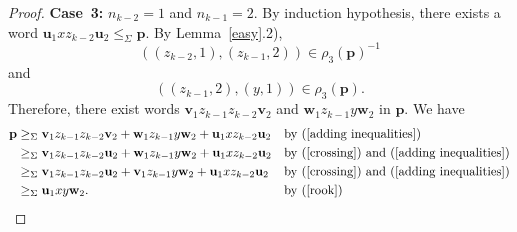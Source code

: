 \documentclass[12pt,draft]{amsart}
\begin{document}
\begin{proof}
\textbf{Case~3:} $n_{k-2}=1$ and $n_{k-1}=2$. By induction hypothesis, there exists a word $\mathbf u_1xz_{k-2}\mathbf u_2\le_{\Sigma}\mathbf p$. By Lemma~\ref{easy}.2), 
$$((z_{k-2},1),(z_{k-1},2))\in\rho_3(\mathbf p)^{-1}$$ 
and 
$$((z_{k-1},2),(y,1))\in\rho_3(\mathbf p).$$ 
Therefore, there exist words $\mathbf v_1z_{k-1}z_{k-2}\mathbf v_2$ and $\mathbf w_1z_{k-1}y\mathbf w_2$ in $\mathbf p$. We have
\begin{align*}
\mathbf p&\ge_{\Sigma}\mathbf v_1z_{k-1}z_{k-2}\mathbf v_2+\mathbf w_1z_{k-1}y\mathbf w_2+\mathbf u_1xz_{k-2}\mathbf u_2&&\text{by~(\ref{adding inequalities})}\\
&\ge_{\Sigma}\mathbf v_1z_{k-1}z_{k-2}\mathbf u_2+\mathbf w_1z_{k-1}y\mathbf w_2+\mathbf u_1xz_{k-2}\mathbf u_2&&\text{by~(\ref{crossing}) and~(\ref{adding inequalities})}\\
&\ge_{\Sigma}\mathbf v_1z_{k-1}z_{k-2}\mathbf u_2+\mathbf v_1z_{k-1}y\mathbf w_2+\mathbf u_1xz_{k-2}\mathbf u_2&&\text{by~(\ref{crossing}) and~(\ref{adding inequalities})}\\
&\ge_{\Sigma}\mathbf u_1xy\mathbf w_2.&&\text{by~(\ref{rook})}
\end{align*}
\end{proof}
\end{document}
